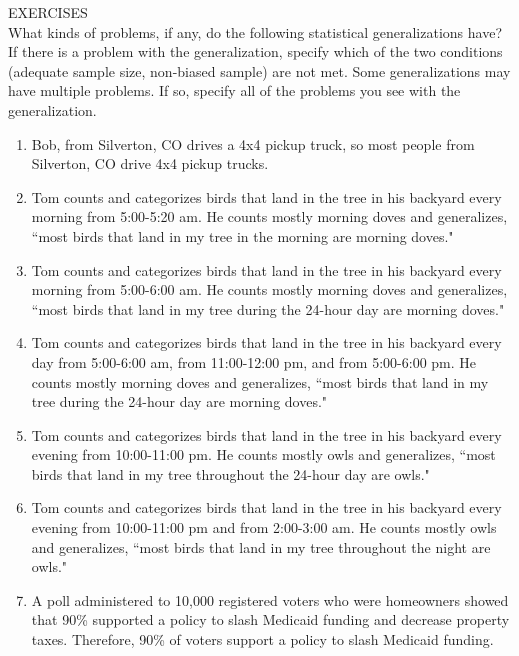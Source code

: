 EXERCISES \\

What kinds of problems, if any, do the following statistical
generalizations have? If there is a problem with the generalization,
specify which of the two conditions (adequate sample size, non-biased
sample) are not met. Some generalizations may have multiple problems.
If so, specify all of the problems you see with the generalization.

\begin{enumerate}
\item Bob, from Silverton, CO drives a 4x4 pickup truck, so most people
from Silverton, CO drive 4x4 pickup trucks.

\item Tom counts and categorizes birds that land in the tree in his backyard
every morning from 5:00-5:20 am. He counts mostly morning doves
and generalizes, ``most birds that land in my tree in the morning are
morning doves."

\item Tom counts and categorizes birds that land in the tree in his backyard
every morning from 5:00-6:00 am. He counts mostly morning doves
and generalizes, ``most birds that land in my tree during the 24-hour
day are morning doves."

\item Tom counts and categorizes birds that land in the tree in his backyard
every day from 5:00-6:00 am, from 11:00-12:00 pm, and from 5:00-6:00 pm. He counts mostly morning doves and generalizes, ``most
birds that land in my tree during the 24-hour day are morning doves."

\item Tom counts and categorizes birds that land in the tree in his backyard
every evening from 10:00-11:00 pm. He counts mostly owls and
generalizes, ``most birds that land in my tree throughout the 24-hour
day are owls."

\item Tom counts and categorizes birds that land in the tree in his backyard
every evening from 10:00-11:00 pm and from 2:00-3:00 am. He
counts mostly owls and generalizes, ``most birds that land in my tree
throughout the night are owls."

\item A poll administered to 10,000 registered voters who were homeowners showed that 90\% 
supported a policy to slash Medicaid
funding and decrease property taxes. Therefore, 90\% 
of voters
support a policy to slash Medicaid funding.


\end{enumerate}
